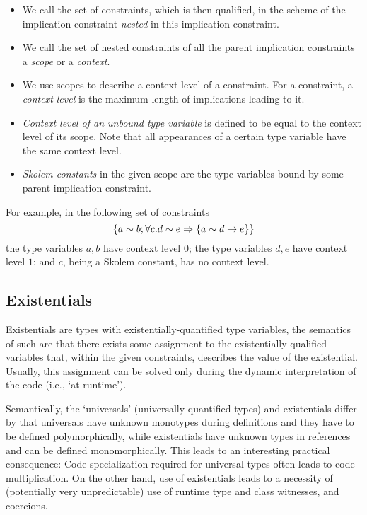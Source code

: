 \begin{defn}[Naming]
    \begin{itemize}
        \item We call the set of constraints, which is then qualified, in the scheme of the implication constraint \emph{nested} in this implication constraint.

        \item We call the set of nested constraints of all the parent implication constraints a \emph{scope} or a \emph{context}.

        \item We use scopes to describe a context level of a constraint. For a constraint, a \emph{context level} is the maximum length of implications leading to it.

        \item \emph{Context level of an unbound type variable} is defined to be equal to the context level of its scope. Note that all appearances of a certain type variable have the same context level.

        \item \emph{Skolem constants} in the given scope are the type variables bound by some parent implication constraint.
    \end{itemize}
\end{defn}

For example, in the following set of constraints
\[ \left\{ a \sim b; \forall c. d \sim e \Rightarrow \left\{ a \sim d \to e \right\} \right\} \]
the type variables $a, b$ have context level $0$; the type variables $d, e$ have context level $1$; and $c$, being a Skolem constant, has no context level.

\subsection{Existentials}

\label{existentials}

Existentials are types with existentially-quantified type variables, the semantics of such are that there exists some assignment to the existentially-qualified variables that, within the given constraints, describes the value of the existential. Usually, this assignment can be solved only during the dynamic interpretation of the code (i.e., `at runtime').

Semantically, the `universals' (universally quantified types) and existentials differ by that universals have unknown monotypes during definitions and they have to be defined polymorphically, while existentials have unknown types in references and can be defined monomorphically. This leads to an interesting practical consequence: Code specialization required for universal types often leads to code multiplication. On the other hand, use of existentials leads to a necessity of (potentially very unpredictable) use of runtime type and class witnesses, and coercions.

